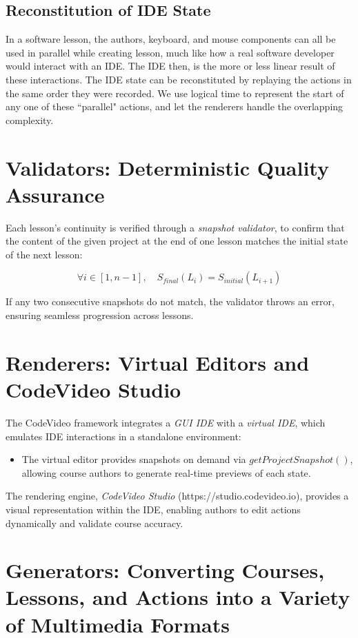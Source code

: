 \documentclass[11pt, a4paper]{article}
\begin{document}
\subsection{Reconstitution of IDE State}

In a software lesson, the authors, keyboard, and mouse components can all be used in parallel while creating lesson, much like how a real software developer would interact with an IDE. The IDE then, is the more or less linear result of these interactions. The IDE state can be reconstituted by replaying the actions in the same order they were recorded. We use logical time to represent the start of any one of these ``parallel" actions, and let the renderers handle the overlapping complexity.

\section{Validators: Deterministic Quality Assurance}

Each lesson’s continuity is verified through a \textit{snapshot validator}, to confirm that the content of the given project at the end of one lesson matches the initial state of the next lesson:

\[
\forall i \in [1, n-1], \quad S_{final}(L_i) = S_{initial}(L_{i+1})
\]

If any two consecutive snapshots do not match, the validator throws an error, ensuring seamless progression across lessons.

\section{Renderers: Virtual Editors and CodeVideo Studio}

The CodeVideo framework integrates a \textit{GUI IDE} with a \textit{virtual IDE}, which emulates IDE interactions in a standalone environment:

\begin{itemize}
    \item The virtual editor provides snapshots on demand via \( getProjectSnapshot() \), allowing course authors to generate real-time previews of each state.
\end{itemize}

The rendering engine, \textit{CodeVideo Studio} (https://studio.codevideo.io), provides a visual representation within the IDE, enabling authors to edit actions dynamically and validate course accuracy.

\section{Generators: Converting Courses, Lessons, and Actions into a Variety of Multimedia Formats}
\end{document}
